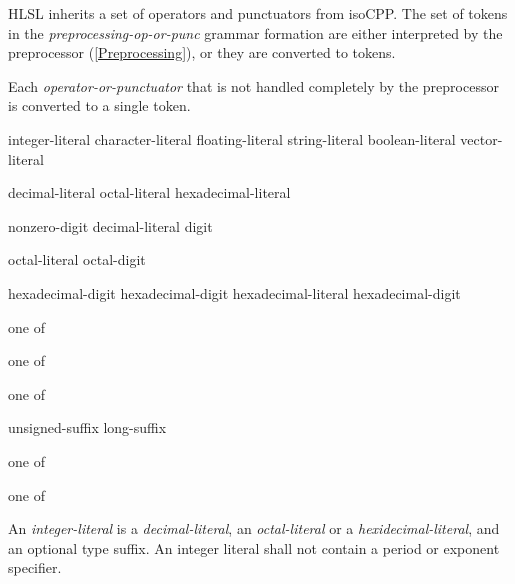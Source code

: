 \p HLSL inherits a set of operators and punctuators from \gls{isoCPP}. The set
of tokens in the \textit{preprocessing-op-or-punc} grammar formation are either
interpreted by the preprocessor (\ref{Preprocessing}), or they are converted to
tokens.

\p Each \textit{operator-or-punctuator} that is not handled completely by the
preprocessor is converted to a single token.


\begin{grammar}
  \br
  integer-literal\br
  character-literal\br
  floating-literal\br
  string-literal\br
  boolean-literal\br
  vector-literal
\end{grammar}


\begin{grammar}
  \br
  decimal-literal \br
  octal-literal \br
  hexadecimal-literal 

  \br
  nonzero-digit\br
  decimal-literal digit

  \br
  octal-literal octal-digit

  \br
   hexadecimal-digit\br
   hexadecimal-digit\br
  hexadecimal-literal hexadecimal-digit

   \textnormal{one of}\br

   \textnormal{one of}\br

   \textnormal{one of}\br
  \br
  \br

  \br
  unsigned-suffix \br
  long-suffix 

   \textnormal{one of}\br

   \textnormal{one of}\br
\end{grammar}

\p An \textit{integer-literal} is a \textit{decimal-literal}, an
\textit{octal-literal} or a \textit{hexidecimal-literal}, and an optional type
suffix. An integer literal shall not contain a period or exponent specifier.

